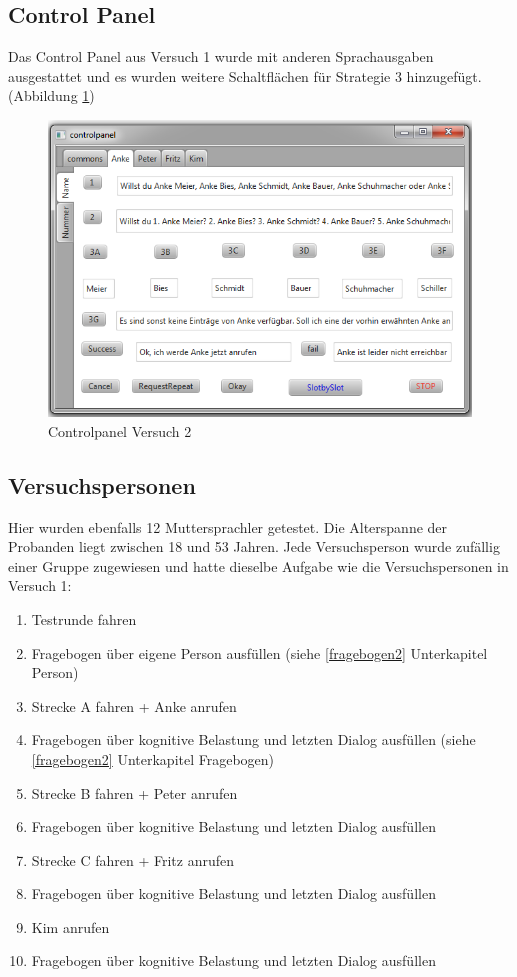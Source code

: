 \documentclass[12pt,a4paper]{scrartcl}
\begin{document}
\subsection{Control Panel}
Das Control Panel aus Versuch 1 wurde mit anderen Sprachausgaben ausgestattet und es wurden weitere Schaltflächen für Strategie 3 hinzugefügt. (Abbildung \ref{cp2})
\begin{figure}[H]
\includegraphics[width=13cm]{controlpanel2.png}
\caption{Controlpanel Versuch 2}
\label{cp2}
\end{figure}


\subsection{Versuchspersonen}

Hier wurden ebenfalls 12 Muttersprachler getestet. Die Alterspanne der Probanden liegt zwischen 18 und 53 Jahren. Jede Versuchsperson wurde zufällig einer Gruppe zugewiesen und hatte dieselbe Aufgabe wie die Versuchspersonen in Versuch 1: 
\begin{enumerate}
\item Testrunde fahren
\item Fragebogen über eigene Person ausfüllen (siehe \ref{fragebogen2} Unterkapitel Person)
\item Strecke A fahren + Anke anrufen
\item Fragebogen über kognitive Belastung und letzten Dialog ausfüllen (siehe \ref{fragebogen2} Unterkapitel Fragebogen)
\item Strecke B fahren + Peter anrufen
\item Fragebogen über kognitive Belastung und letzten Dialog ausfüllen
\item Strecke C fahren + Fritz anrufen
\item Fragebogen über kognitive Belastung und letzten Dialog ausfüllen 
\item Kim anrufen
\item Fragebogen über kognitive Belastung und letzten Dialog ausfüllen 
\end{enumerate}
\end{document}
